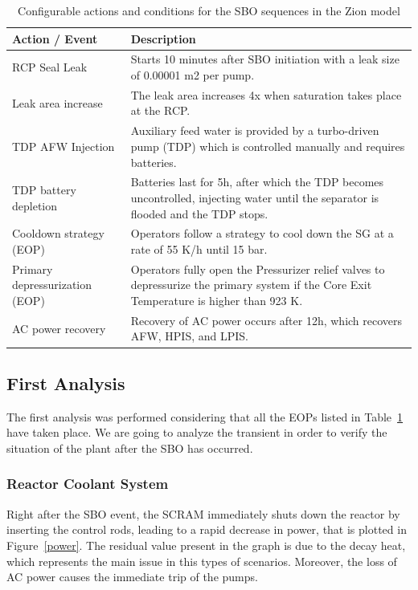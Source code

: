 \documentclass[a4paper,11pt]{article}
\numberwithin{subsubsection}{subsection}
\numberwithin{subsection}{section}
\newcommand{\figref}[1]{Figure~\ref{#1}}
\newcommand{\tabref}[1]{Table~\ref{#1}}
\begin{document}
\begin{table}[h!]
\centering
\renewcommand{\arraystretch}{1.3}
\begin{tabular}{|p{4.5cm}|p{10.5cm}|}
\hline
\textbf{Action / Event} & \textbf{Description} \\ \hline
RCP Seal Leak & Starts 10 minutes after SBO initiation with a leak size of 0.00001 m2 per pump. \\ \hline
Leak area increase & The leak area increases 4x when saturation takes place at the RCP. \\ \hline
TDP AFW Injection & Auxiliary feed water is provided by a turbo-driven pump (TDP) which is controlled manually and requires batteries. \\ \hline
TDP battery depletion & Batteries last for 5h, after which the TDP becomes uncontrolled, injecting water until the separator is flooded and the TDP stops. \\ \hline
Cooldown strategy (EOP) & Operators follow a strategy to cool down the SG at a rate of 55 K/h until 15 bar. \\ \hline
Primary depressurization (EOP) & Operators fully open the Pressurizer relief valves to depressurize the primary system if the Core Exit Temperature is higher than 923 K. \\ \hline
AC power recovery & Recovery of AC power occurs after 12h, which recovers AFW, HPIS, and LPIS. \\ \hline
\end{tabular}
\caption{Configurable actions and conditions for the SBO sequences in the Zion model}
\label{tab:sbo_actions_en}
\end{table}

\subsection{First Analysis}

\noindent The first analysis was performed considering that all the EOPs
listed in \tabref{tab:sbo_actions_en} have taken place. We are going to 
analyze the transient in order to verify the situation of the plant after the 
SBO has occurred. 

\subsubsection{Reactor Coolant System}

\noindent Right after the SBO event, the SCRAM immediately shuts down 
the reactor by inserting the control rods, leading to a rapid decrease in power, that 
is plotted in \figref{power}. The residual value present in the graph 
is due to the decay heat, which represents the main issue in this types of scenarios.
Moreover, the loss of AC power causes the immediate trip of the pumps.
\end{document}
